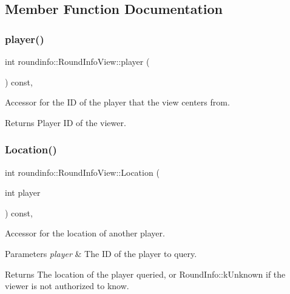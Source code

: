 \subsection{Member Function Documentation}
\mbox{\label{classroundinfo_1_1_round_info_view_acb1e4edcbe9b01f59ba26542f528ba24}} 
\subsubsection{\texorpdfstring{player()}{player()}}
{\footnotesize\ttfamily int roundinfo\+::\+Round\+Info\+View\+::player (\begin{DoxyParamCaption}{ }\end{DoxyParamCaption}) const\hspace{0.3cm}{\ttfamily [inline]}, {\ttfamily [noexcept]}}



Accessor for the ID of the player that the view centers from. 

\begin{DoxyReturn}{Returns}
Player ID of the viewer. 
\end{DoxyReturn}
\mbox{\label{classroundinfo_1_1_round_info_view_a05f42a982570552bbeb8c330e62437ad}} 
\subsubsection{\texorpdfstring{Location()}{Location()}}
{\footnotesize\ttfamily int roundinfo\+::\+Round\+Info\+View\+::\+Location (\begin{DoxyParamCaption}\item[{int}]{player }\end{DoxyParamCaption}) const\hspace{0.3cm}{\ttfamily [inline]}, {\ttfamily [noexcept]}}



Accessor for the location of another player. 


\begin{DoxyParams}{Parameters}
{\em player} & The ID of the player to query. \\
\hline
\end{DoxyParams}
\begin{DoxyReturn}{Returns}
The location of the player queried, or {\ttfamily Round\+Info\+::k\+Unknown} if the viewer is not authorized to know. 
\end{DoxyReturn}
\mbox{\label{classroundinfo_1_1_round_info_view_ac2d60e02ab84297d958b5b5caa653c7b}} 
